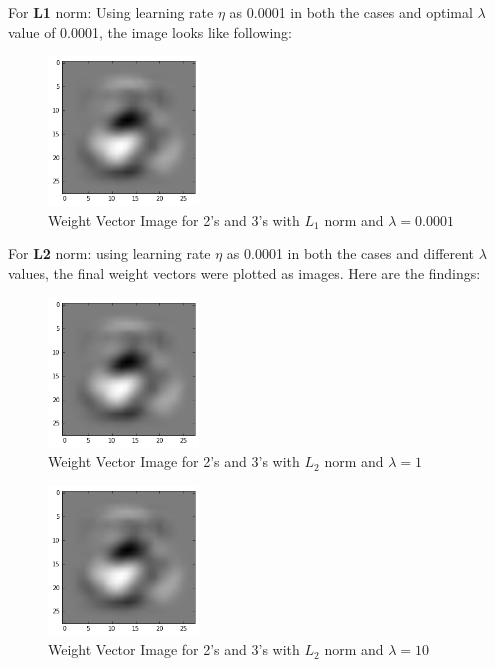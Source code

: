 \documentclass{article}
\begin{document}
For \textbf{L1} norm: Using learning rate $\eta$ as 0.0001 in both the cases and optimal $\lambda$ value of 0.0001, the image looks like following:
\newpage
\begin{figure}[h!]
    \centering
  \includegraphics[width=40mm, scale=0.5]{graphs/23WeightsImage_Regularization.PNG}
  \caption{Weight Vector Image for 2's and 3's with $L_{1}$ norm and $\lambda = 0.0001$}
  \label{fig19}
\end{figure}


For \textbf{L2} norm: using learning rate $\eta$ as 0.0001 in both the cases and different $\lambda$ values, the final weight vectors were plotted as images. Here are the findings:

\begin{figure}[h!]
  \centering
  \includegraphics[width=40mm, scale=0.5]{graphs/23Weights_l2_1.PNG}
  \caption{Weight Vector Image for 2's and 3's with $L_{2}$ norm and $\lambda = 1$}
  \label{fig:graph 5(e) l2}
\end{figure} 

\begin{figure}[h!]
    \centering
  \includegraphics[width=40mm, scale=0.5]{graphs/23Weights_l2_10.PNG}
  \caption{Weight Vector Image for 2's and 3's with $L_{2}$ norm and $\lambda = 10$}
  \label{fig:graph 5(e) l1}
\end{figure}
\end{document}
